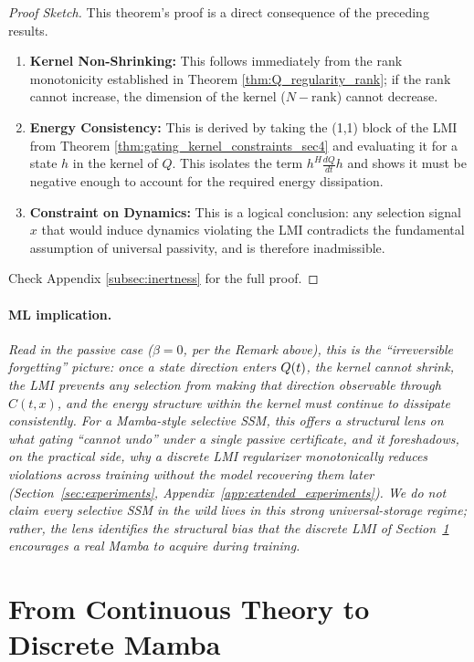 \documentclass[10pt]{article} %
\let\ker\relax\DeclareMathOperator{\ker}{Ker}           %
\theoremstyle{definition}
\begin{document}
\begin{proof}[Proof Sketch]
This theorem's proof is a direct consequence of the preceding results.
\begin{enumerate}
    \item \textbf{Kernel Non-Shrinking:} This follows immediately from the rank monotonicity established in Theorem \ref{thm:Q_regularity_rank}; if the rank cannot increase, the dimension of the kernel ($N - \text{rank}$) cannot decrease.
    \item \textbf{Energy Consistency:} This is derived by taking the (1,1) block of the LMI from Theorem \ref{thm:gating_kernel_constraints_sec4} and evaluating it for a state $h$ in the kernel of $Q$. This isolates the term $h^H \frac{dQ}{dt} h$ and shows it must be negative enough to account for the required energy dissipation.
    \item \textbf{Constraint on Dynamics:} This is a logical conclusion: any selection signal $x$ that would induce dynamics violating the LMI contradicts the fundamental assumption of universal passivity, and is therefore inadmissible.
\end{enumerate}
Check Appendix \ref{subsec:inertness} for the full proof.
\end{proof}

\paragraph{ML implication.} \textit{Read in the passive case ($\beta=0$, per the Remark above), this is the ``irreversible forgetting'' picture: once a state direction enters $\ker Q(t)$, the kernel cannot shrink, the LMI prevents any selection from making that direction observable through $C(t,x)$, and the energy structure within the kernel must continue to dissipate consistently. For a Mamba-style selective SSM, this offers a structural lens on what gating ``cannot undo'' under a single passive certificate, and it foreshadows, on the practical side, why a discrete LMI regularizer monotonically reduces violations across training without the model recovering them later (Section~\ref{sec:experiments}, Appendix~\ref{app:extended_experiments}). We do not claim every selective SSM in the wild lives in this strong universal-storage regime; rather, the lens identifies the structural bias that the discrete LMI of Section~\ref{sec:discrete_bridge} encourages a real Mamba to acquire during training.}

\section{From Continuous Theory to Discrete Mamba}
\label{sec:discrete_bridge}
\end{document}
